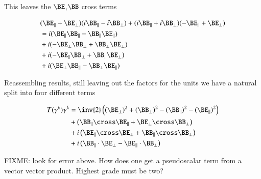 \documentclass{article}
\begin{document}
This leaves the $\BE$,$\BB$ cross terms

\begin{align*}
&(\BE_\parallel + \BE_\perp ) (i \BB_\parallel - i \BB_\perp) 
+(i \BB_\parallel + i \BB_\perp) (-\BE_\parallel +\BE_\perp ) \\
&=
i (\BE_\parallel \BB_\parallel  - \BB_\parallel \BE_\parallel ) \\
&+i (-\BE_\perp \BB_\perp + \BB_\perp \BE_\perp ) \\
&+i ( -\BE_\parallel \BB_\perp + \BB_\parallel \BE_\perp ) \\
&+i ( \BE_\perp \BB_\parallel - \BB_\perp \BE_\parallel ) \\
\end{align*}

Reassembling results, still leaving out the factors for the units we have a natural split into four different terms

\begin{align*}
T(\gamma^k) \gamma^k 
&= \inv{2} \left((\BE_\perp)^2 + (\BB_\perp)^2 -(\BB_\parallel)^2 -(\BE_\parallel)^2 \right) \\
&+ \left(\BB_\parallel \cross \BE_\parallel + \BE_\perp \cross \BB_\perp \right) \\
&+ i \left(\BE_\parallel \cross \BE_\perp + \BB_\parallel \cross \BB_\perp \right) \\
&+ i \left(\BB_\parallel \cdot \BE_\perp - \BE_\parallel \cdot \BB_\perp \right) \\
\end{align*}

FIXME: look for error above.  How does one get a pseudoscalar term from a vector vector product.  Highest grade must be two?




\end{document}
